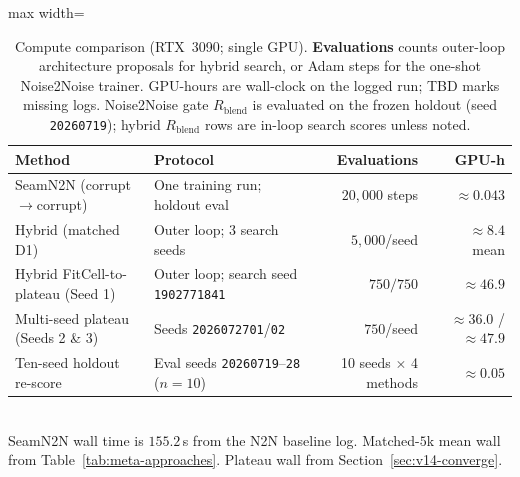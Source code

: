 \begin{table}[t]
  \centering
  \caption{Compute comparison (RTX~3090; single GPU).
    \textbf{Evaluations} counts outer-loop architecture proposals for hybrid search, or Adam steps for the one-shot Noise2Noise trainer.
    GPU-hours are wall-clock on the logged run; TBD marks missing logs.
    Noise2Noise gate $R_{\mathrm{blend}}$ is evaluated on the frozen holdout (seed \texttt{20260719}); hybrid $R_{\mathrm{blend}}$ rows are in-loop search scores unless noted.}
  \label{tab:compute-n2n-hybrid}
  \setlength{\tabcolsep}{3pt}
  \footnotesize
  \begin{adjustbox}{max width=\columnwidth}
  \begin{tabular}{@{}lp{}rr@{}}
    \toprule
    Method & Protocol & Evaluations & GPU-h \\
    \midrule
    SeamN2N (corrupt$\to$corrupt) & One training run; holdout eval & $20{,}000$ steps & ${\approx}0.043$ \\
    Hybrid (matched D1) & Outer loop; 3 search seeds & $5{,}000$/seed & ${\approx}8.4$ mean \\
    Hybrid FitCell-to-plateau (Seed 1) & Outer loop; search seed \texttt{1902771841} & $750/750$ & ${\approx}46.9$ \\
    Multi-seed plateau (Seeds 2 \& 3) & Seeds \texttt{2026072701}/\texttt{02} & $750$/seed & ${\approx}36.0$ / ${\approx}47.9$ \\
    Ten-seed holdout re-score & Eval seeds \texttt{20260719}--\texttt{28} ($n{=}10$) & 10 seeds $\times$ 4 methods & ${\approx}0.05$ \\
    \bottomrule
  \end{tabular}
  \end{adjustbox}\\[0.35em]
  {\footnotesize SeamN2N wall time is $155.2$\,s from the N2N baseline log.
  Matched-$5$k mean wall from Table~\ref{tab:meta-approaches}.
  Plateau wall from Section~\ref{sec:v14-converge}.}
\end{table}
